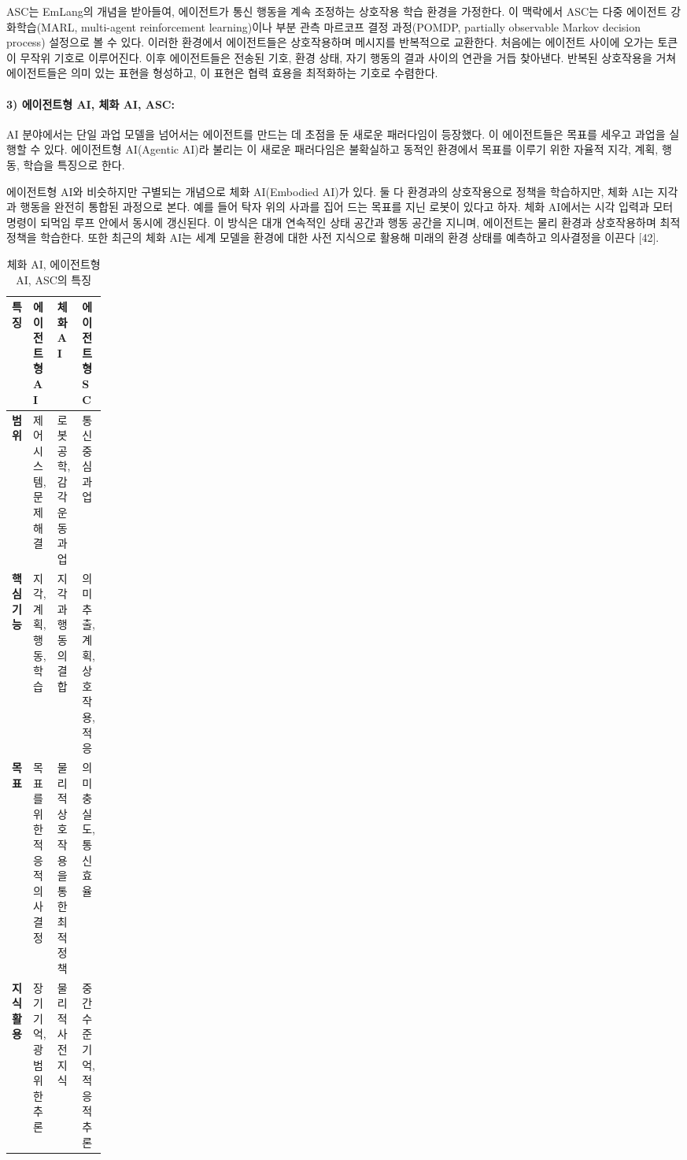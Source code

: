 ASC는 EmLang의 개념을 받아들여, 에이전트가 통신 행동을 계속 조정하는 상호작용 학습 환경을 가정한다. 이 맥락에서 ASC는 다중 에이전트 강화학습(MARL, multi-agent reinforcement learning)이나 부분 관측 마르코프 결정 과정(POMDP, partially observable Markov decision process) 설정으로 볼 수 있다. 이러한 환경에서 에이전트들은 상호작용하며 메시지를 반복적으로 교환한다. 처음에는 에이전트 사이에 오가는 토큰이 무작위 기호로 이루어진다. 이후 에이전트들은 전송된 기호, 환경 상태, 자기 행동의 결과 사이의 연관을 거듭 찾아낸다. 반복된 상호작용을 거쳐 에이전트들은 의미 있는 표현을 형성하고, 이 표현은 협력 효용을 최적화하는 기호로 수렴한다.

\paragraph{3) 에이전트형 AI, 체화 AI, ASC:} AI 분야에서는 단일 과업 모델을 넘어서는 에이전트를 만드는 데 초점을 둔 새로운 패러다임이 등장했다. 이 에이전트들은 목표를 세우고 과업을 실행할 수 있다. 에이전트형 AI(Agentic AI)라 불리는 이 새로운 패러다임은 불확실하고 동적인 환경에서 목표를 이루기 위한 자율적 지각, 계획, 행동, 학습을 특징으로 한다.

에이전트형 AI와 비슷하지만 구별되는 개념으로 체화 AI(Embodied AI)가 있다. 둘 다 환경과의 상호작용으로 정책을 학습하지만, 체화 AI는 지각과 행동을 완전히 통합된 과정으로 본다. 예를 들어 탁자 위의 사과를 집어 드는 목표를 지닌 로봇이 있다고 하자. 체화 AI에서는 시각 입력과 모터 명령이 되먹임 루프 안에서 동시에 갱신된다. 이 방식은 대개 연속적인 상태 공간과 행동 공간을 지니며, 에이전트는 물리 환경과 상호작용하며 최적 정책을 학습한다. 또한 최근의 체화 AI는 세계 모델을 환경에 대한 사전 지식으로 활용해 미래의 환경 상태를 예측하고 의사결정을 이끈다 [42].

\setcounter{table}{4}
\begin{table}[htbp]
\centering
\caption{체화 AI, 에이전트형 AI, ASC의 특징}
\label{tab:5}
\small
\renewcommand{\arraystretch}{1.2}
\begin{tabularx}{\linewidth}{|>{\centering\arraybackslash}p{0.14\linewidth}|>{\centering\arraybackslash}X|>{\centering\arraybackslash}X|>{\centering\arraybackslash}X|}
\hline
\textbf{특징} & \textbf{에이전트형 AI} & \textbf{체화 AI} & \textbf{에이전트형 SC} \\
\hline
\textbf{범위} & 제어 시스템, 문제 해결 & 로봇공학, 감각운동 과업 & 통신 중심 과업 \\
\hline
\textbf{핵심 기능} & 지각, 계획, 행동, 학습 & 지각과 행동의 결합 & 의미 추출, 계획, 상호작용, 적응 \\
\hline
\textbf{목표} & 목표를 위한 적응적 의사결정 & 물리적 상호작용을 통한 최적 정책 & 의미 충실도, 통신 효율 \\
\hline
\textbf{지식 활용} & 장기 기억, 광범위한 추론 & 물리적 사전 지식 & 중간 수준 기억, 적응적 추론 \\
\hline
\end{tabularx}
\end{table}

